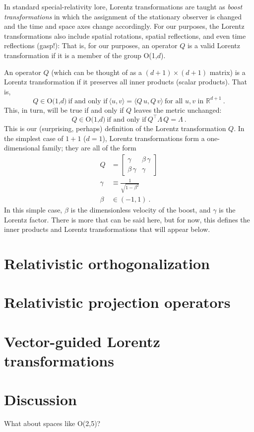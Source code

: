 \documentclass{article}
\newcommand{\inner}[2]{\langle{#1},{#2}\rangle}
\begin{document}
In standard special-relativity lore, Lorentz transformations are taught as \emph{boost transformations} in which the assignment of the stationary observer is changed and the time and space axes change accordingly.
For our purposes, the Lorentz transformations also include spatial rotations, spatial reflections, and even time reflections (gasp!):
That is, for our purposes, an operator $Q$ is a valid Lorentz transformation if it is a member of the group O(1,$d$).

An operator $Q$ (which can be thought of as a $(d+1)\times(d+1)$ matrix) is a Lorentz transformation if it preserves all inner products (scalar products). That is,
\begin{equation}
    Q \in \mbox{O(1,$d$)} ~ \mbox{if and only if} ~ \inner{u}{v}=\inner{Q\,u}{Q\,v} ~ \mbox{for all $u,v$ in $\mathbb{R}^{d+1}$} ~ .
\end{equation}
This, in turn, will be true if and only if $Q$ leaves the metric unchanged:
\begin{equation}
    Q \in \mbox{O(1,$d$)} ~ \mbox{if and only if} ~ Q^\top\Lambda\,Q=\Lambda ~ .
\end{equation}
This is our (surprising, perhaps) definition of the Lorentz transformation $Q$.
In the simplest case of $1+1$ ($d=1$), Lorentz transformations form a one-dimensional family; they are all of the form
\begin{align}
    Q &= \begin{bmatrix}\gamma & \beta\,\gamma \\ \beta\,\gamma & \gamma\end{bmatrix}
    \\
    \gamma &\equiv \frac{1}{\sqrt{1 - \beta^2}}
    \\
    \beta &\in (-1,1) ~.
\end{align}
In this simple case, $\beta$ is the dimensionless velocity of the boost, and $\gamma$ is the Lorentz factor.
There is more that can be said here, but for now, this defines the inner products and Lorentz transformations that will appear below.

\section{Relativistic orthogonalization}

\section{Relativistic projection operators}

\section{Vector-guided Lorentz transformations}

\section{Discussion}

What about spaces like O(2,5)?
\end{document}
